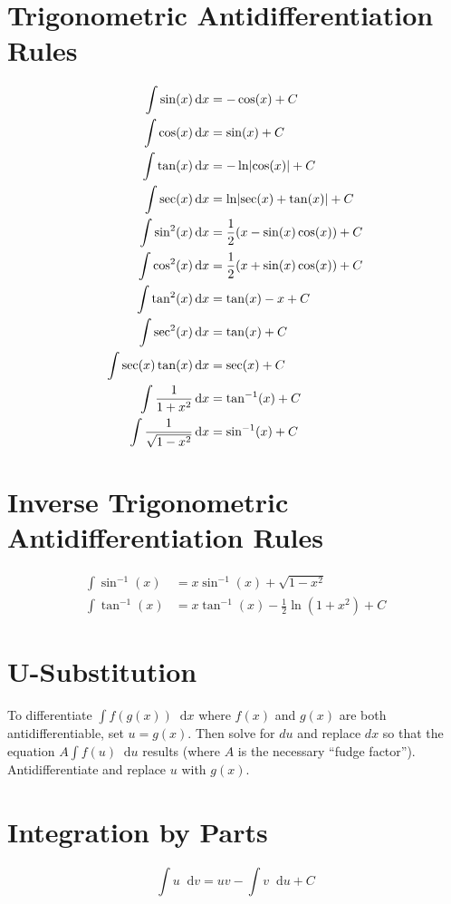 \documentclass[12pt]{article}
\DeclarePairedDelimiter\abs{\lvert}{\rvert}
\newcommand*{\asin}{\sin^{-1}}
\newcommand*{\atan}{\tan^{-1}}
\newcommand*{\D}[1]{\mathop{}\!\mathrm{d}#1}
\newcommand*{\fixmath}{%
  \makebox{}\vspace{\glueexpr-\baselineskip-\abovedisplayskip}}
\newenvironment{fixaskip}{\setlength{\abovedisplayskip}{0pt}\fixmath%
  \ignorespaces}{\ignorespacesafterend}
\newenvironment{fixskip}{\setlength{\abovedisplayskip}{0pt}%
  \setlength{\belowdisplayskip}{0pt}\fixmath\ignorespaces}%
  {\ignorespacesafterend}
\begin{document}
\section*{Trigonometric Antidifferentiation Rules}
\begin{fixskip}
  \begin{align*}
    \int \sin(x) \D{x} &= -\cos(x) + C\\
    \int \cos(x) \D{x} &= \sin(x) + C\\
    \int \tan(x) \D{x} &= -\ln\abs*{\cos(x)} + C\\
    \int \sec(x) \D{x} &= \ln\abs*{\sec(x)+\tan(x)} + C\\
    \int \sin^2(x) \D{x} &= \frac{1}{2} (x - \sin(x)\cos(x)) + C\\
    \int \cos^2(x) \D{x} &= \frac{1}{2} (x + \sin(x)\cos(x)) + C\\
    \int \tan^2(x) \D{x} &= \tan(x) - x + C\\
    \int \sec^2(x) \D{x} &= \tan(x) + C\\
    \int \sec(x) \tan(x) \D{x} &= \sec(x) + C\\
    \int \frac{1}{1+x^2} \D{x} &= \atan(x) + C\\
    \int \frac{1}{\sqrt{1-x^2}} \D{x} &= \asin(x) + C
  \end{align*}
\end{fixskip}
\section*{Inverse Trigonometric Antidifferentiation Rules}
\begin{fixskip}
  \begin{align*}
    \int \asin(x) &= x\asin(x) + \sqrt{1-x^2}\\
    \int \atan(x) &= x\atan(x) - \frac{1}{2} \ln(1 + x^2) + C
  \end{align*}
\end{fixskip}
\section*{U-Substitution}
To differentiate \(\int f(g(x)) \D{x}\) where \(f(x)\) and \(g(x)\) are both
antidifferentiable, set \(u = g(x)\). Then solve for \(du\) and replace \(dx\)
so that the equation \(A\int f(u) \D{u}\) results (where \(A\) is the necessary
``fudge factor''). Antidifferentiate and replace \(u\) with \(g(x)\).
\section*{Integration by Parts}
\begin{fixaskip}
  \[
    \int u \D{v} = uv - \int v \D{u} + C
  \]
\end{fixaskip}
\end{document}
